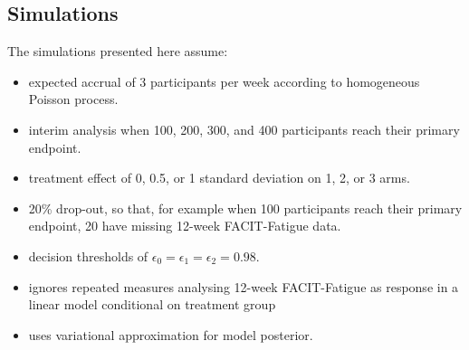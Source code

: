 \documentclass[11pt,parskip=half-]{scrartcl}
\begin{document}
\subsection*{Simulations}

The simulations presented here assume:
\begin{itemize}
  \item expected accrual of 3 participants per week according to homogeneous Poisson process.
  \item interim analysis when 100, 200, 300, and 400 participants reach their primary endpoint.
  \item treatment effect of 0, 0.5, or 1 standard deviation on 1, 2, or 3 arms.
  \item 20\% drop-out, so that, for example when 100 participants reach their primary endpoint, 20 have missing 12-week FACIT-Fatigue data.
  \item decision thresholds of $\epsilon_0=\epsilon_1=\epsilon_2=0.98$.
  \item ignores repeated measures analysing 12-week FACIT-Fatigue as response in a linear model conditional on treatment group
  \item uses variational approximation for model posterior.
\end{itemize}










\end{document}
